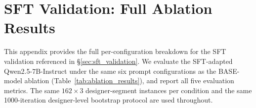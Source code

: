 
\section{SFT Validation: Full Ablation Results}
\label{app:sft_ablation}

This appendix provides the full per-configuration breakdown for the SFT validation
referenced in §\ref{sec:sft_validation}. We evaluate the SFT-adapted Qwen2.5-7B-Instruct
under the same six prompt configurations as the BASE-model ablation
(Table~\ref{tab:ablation_results}), and report all five evaluation metrics. The same
$162 \times 3$ designer-segment instances per condition and the same 1000-iteration
designer-level bootstrap protocol are used throughout.

